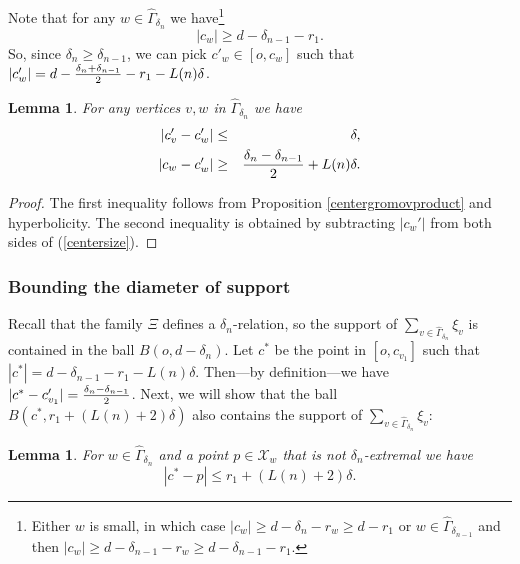 \documentclass[11pt,letterpaper]{amsart}
\newtheorem{lemma}[theorem]{Lemma}
\begin{document}
Note that for any $w\in\hat\Gamma_{\delta_n}$ we have\footnote{Either $w$ is small, in which case $|c_w|\geq d-\delta_{n}-r_w\geq d-r_1$ or $w\in\hat\Gamma_{\delta_{n-1}}$ and then $|c_w|\geq d-\delta_{n-1}-r_w\geq d-\delta_{n-1}-r_1$.} 
\begin{equation}
\label{centersize}
|c_w|\geq d-\delta_{n-1}-r_1.
\end{equation} 
So, since $\delta_n\geq\delta_{n-1}$, we can pick $c'_w\in [o,c_w]$ such that $|c'_w|=d-{\delta_n+\delta_{n-1}\over 2}-r_1-L(n)\delta$. %
\begin{lemma}
For any vertices $v,w$ in $\hat\Gamma_{\delta_n}$ we have 
\begin{eqnarray*}
|c'_v-c'_w|&\leq&\delta,\\
|c_w-c_w'|&\geq&{\delta_n-\delta_{n-1}\over 2}+L(n)\delta.
\end{eqnarray*}
\end{lemma}
\begin{proof}
The first inequality follows from Proposition \ref{centergromovproduct} and hyperbolicity. %
The second inequality is obtained by subtracting $|c_w'|$ from both sides of (\ref{centersize}). 
\end{proof}










\subsubsection*{Bounding the diameter of support}
Recall that the family $\Xi$ defines a $\delta_n$-relation, so the support of $\sum_{v\in\hat\Gamma_{\delta_n}}\xi_v$ is contained in the ball $B(o,d-\delta_n)$. Let $c^*$ be the point in $[o,c_{v_1}]$ such that $|c^*|=d-\delta_{n-1}-r_1-L(n)\delta$. Then---by definition---we have $|c^*-c'_{v_1}|={\delta_n-\delta_{n-1}\over 2}$. 
Next, we will show that %
the ball $B(c^*,r_1+(L(n)+2)\delta)$ also contains the support of $\sum_{v\in\hat\Gamma_{\delta_n}}\xi_v$: 
\begin{lemma} 
\label{radiuslemma}
For $w\in\hat\Gamma_{\delta_n}$ and a point $p\in\mathcal X_w$ that is not $\delta_n$-extremal we have 
$$
|c^*-p|\leq r_1+(L(n)+2)\delta.
$$
\end{lemma}
\end{document}
